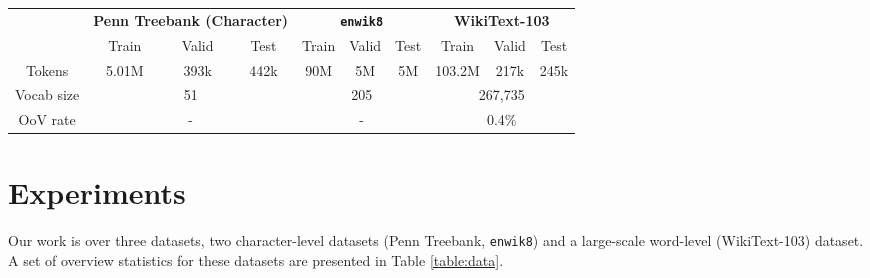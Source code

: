 \documentclass{article}
\newcommand{\enwik}{\texttt{enwik8}\xspace}
\begin{document}
\begin{table*}
\begin{center}
\begin{tabular}[t]{c|ccc|ccc|ccc}
\toprule
& \multicolumn{3}{c|}{{\bf Penn Treebank (Character)}} & \multicolumn{3}{c|}{{\bf \enwik}} & \multicolumn{3}{c}{{\bf WikiText-103}} \\
& Train & Valid & Test & Train & Valid & Test & Train & Valid & Test \\
\midrule
Tokens & 5.01M & 393k & 442k & 90M & 5M & 5M & 103.2M & 217k & 245k \\
\midrule
Vocab size & \multicolumn{3}{c|}{51} & \multicolumn{3}{c|}{205} & \multicolumn{3}{c}{267,735} \\
OoV rate & \multicolumn{3}{c|}{-} & \multicolumn{3}{c|}{-} & \multicolumn{3}{c}{0.4\%} \\
\bottomrule
\end{tabular}
\caption{Statistics of the character-level Penn Treebank, character-level \enwik dataset, and WikiText-103. The out of vocabulary (OoV) rate notes what percentage of tokens have been replaced by an $\langle unk \rangle$ token, not applicable to character-level datasets.}
\label{table:data}
\end{center}
\end{table*}

\section{Experiments}

Our work is over three datasets, two character-level datasets (Penn Treebank, \enwik) and a large-scale word-level (WikiText-103) dataset.
A set of overview statistics for these datasets are presented in Table \ref{table:data}.
\end{document}

